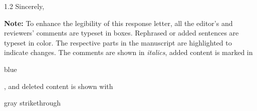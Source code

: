 \begin{spacing}{1.2}
Sincerely,

\vspace{0.7em}

\printauthor%

\vfil
\textbf{Note:} 
To enhance the legibility of this response letter, all the editor's and reviewers' comments are typeset in boxes. Rephrased or added sentences are typeset in color. The respective parts in the manuscript are highlighted to indicate changes.
The comments are shown in \textit{italics}, added content is marked in \begin{add}blue\end{add},
and deleted content is shown with \begin{remove}gray strikethrough\end{remove}
\end{spacing}